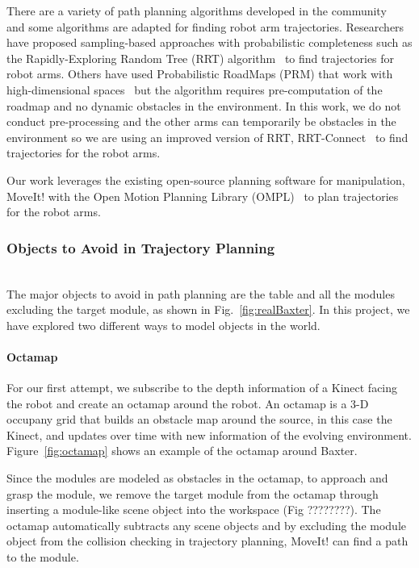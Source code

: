 There are a variety of path planning algorithms developed in the community~\cite{DBLP:books/daglib/0016830} and some algorithms are adapted for finding robot arm trajectories. 
Researchers have proposed sampling-based approaches with probabilistic completeness such as the Rapidly-Exploring Random Tree (RRT) algorithm~\cite{VahrenkampBAKD09} to find trajectories for robot arms. Others have used Probabilistic RoadMaps (PRM) that work with high-dimensional spaces~\cite{KavrakiSLO96} but the algorithm requires pre-computation of the roadmap and no dynamic obstacles in the environment. In this work, we do not conduct pre-processing and the other arms can temporarily be obstacles in the environment so we are using an improved version of RRT, RRT-Connect~\cite{KuffnerL00} to find trajectories for the robot arms.


Our work leverages the existing open-source planning software for manipulation, MoveIt! \cite{moveit} with the Open Motion Planning Library (OMPL)~\cite{sucan2012the-open-motion-planning-library} to plan trajectories for the robot arms. 


\subsubsection{Objects to Avoid in Trajectory Planning}~\\
The major objects to avoid in path planning are the table and all the modules excluding the target module, as shown in Fig.~\ref{fig:realBaxter}. In this project, we have explored two different ways to model objects in the world. 

\paragraph{Octamap}\label{obstacle-octamap}
For our first attempt, we subscribe to the depth information of a Kinect facing the robot and create an octamap around the robot. An octamap is a 3-D occupany grid that builds an obstacle map around the source, in this case the Kinect, and updates over time with new information of the evolving environment. Figure~\ref{fig:octamap} shows an example of the octamap around Baxter.

Since the modules are modeled as obstacles in the octamap, to approach and grasp the module, we remove the target module from the octamap through inserting a module-like scene object into the workspace (Fig ????????). The octamap automatically subtracts any scene objects and by excluding the module object from the collision checking in trajectory planning, MoveIt! can find a path to the module.

